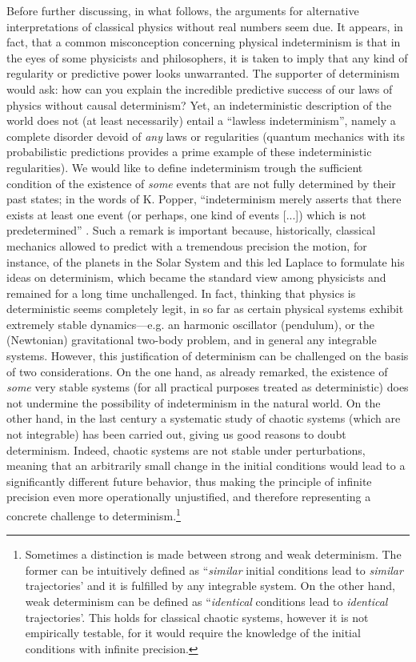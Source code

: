 \documentclass[12pt]{article}
\begin{document}
Before further discussing, in what follows, the arguments for alternative interpretations of classical physics without real numbers seem due. It appears, in fact, that a common misconception concerning physical indeterminism is that in the eyes of some physicists and philosophers, it is taken to imply that any kind of regularity or predictive power looks unwarranted. The supporter of determinism would ask: how can you explain the incredible predictive success of our laws of physics without causal determinism? Yet, an indeterministic description of the world does not (at least necessarily) entail a ``lawless indeterminism'', namely a complete disorder devoid of \emph{any} laws or regularities (quantum mechanics with its probabilistic predictions provides a prime example of these indeterministic regularities). We would like to define indeterminism trough the sufficient condition of the existence of \emph{some} events that are not fully determined by their past states; in the words of K. Popper, ``indeterminism merely asserts that there exists at least one event (or perhaps, one kind of events [...]) which is not predetermined'' \cite{popper50}. Such a remark is important because, historically, classical mechanics allowed to predict with a tremendous precision the motion, for instance, of the planets in the Solar System and this led Laplace to formulate his ideas on determinism, which became the standard view among physicists and remained for a long time unchallenged. In fact, thinking that physics is deterministic seems completely legit, in so far as certain physical systems exhibit extremely stable dynamics---e.g. an harmonic oscillator (pendulum), or the (Newtonian) gravitational two-body problem, and in general any integrable systems.  However, this justification of determinism can be challenged on the basis of two considerations. On the one hand, as already remarked, the existence of \emph{some} very stable systems (for all practical purposes treated as deterministic) does not undermine the possibility of indeterminism in the natural world. On the other hand, in the last century a systematic study of chaotic systems (which are not integrable) has been carried out, giving us good reasons to doubt determinism. Indeed, chaotic systems are not stable under perturbations, meaning that an arbitrarily small change in the initial conditions would lead to a significantly different future behavior, thus making the principle of infinite precision even more operationally unjustified, and therefore representing a concrete challenge to determinism.\footnote{Sometimes a distinction is made between strong and weak determinism. The former can be intuitively defined as ``\emph{similar} initial conditions lead to \emph{similar} trajectories’ and it is fulfilled by any integrable system. On the other hand, weak determinism can be defined as ``\emph{identical} conditions lead to \emph{identical} trajectories’. This holds for classical chaotic systems, however it is not empirically testable, for it would require the knowledge of the initial conditions with infinite precision.}
\end{document}
